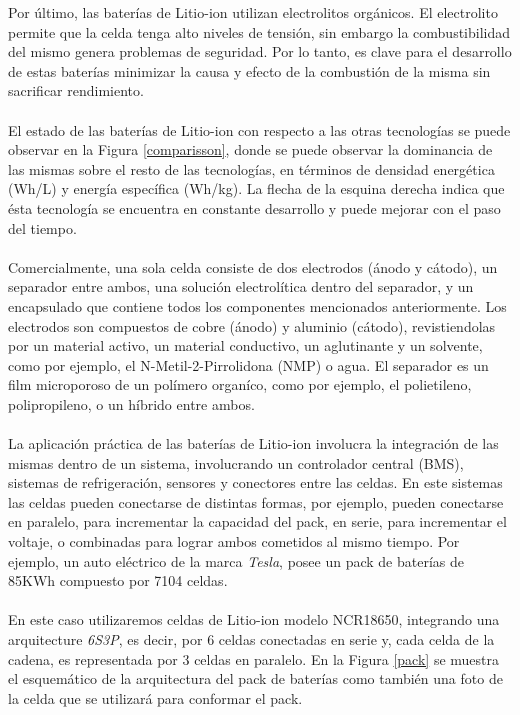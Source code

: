\documentclass[10pt,a4paper]{article}
\begin{document}
\noindent Por último, las baterías de Litio-ion utilizan electrolitos orgánicos. El electrolito permite que la celda tenga alto niveles de tensión, sin embargo la combustibilidad del mismo genera problemas de seguridad. Por lo tanto, es clave para el desarrollo de estas baterías minimizar la causa y efecto de la combustión de la misma sin sacrificar rendimiento.\\
\\
\noindent El estado de las baterías de Litio-ion con respecto a las otras tecnologías se puede observar en la Figura \ref{comparisson}, donde se puede observar la dominancia de las mismas sobre el resto de las tecnologías, en términos de densidad energética (Wh/L) y energía específica (Wh/kg). La flecha de la esquina derecha indica que ésta tecnología se encuentra en constante desarrollo y puede mejorar con el paso del tiempo.\\
\\
\noindent Comercialmente, una sola celda consiste de dos electrodos (ánodo y cátodo), un separador entre ambos, una solución electrolítica dentro del separador, y un encapsulado que contiene todos los componentes mencionados anteriormente. Los electrodos son compuestos de cobre (ánodo) y aluminio (cátodo), revistiendolas por un material activo, un material conductivo, un aglutinante y un solvente, como por ejemplo, el N-Metil-2-Pirrolidona (NMP) o agua. El separador es un film microporoso de un polímero organíco, como por ejemplo, el polietileno, polipropileno, o un híbrido entre ambos.\\
\\
\noindent La aplicación práctica de las baterías de Litio-ion involucra la integración de las mismas dentro de un sistema, involucrando un controlador central (BMS), sistemas de refrigeración, sensores y conectores entre las celdas. En este sistemas las celdas pueden conectarse de distintas formas, por ejemplo, pueden conectarse en paralelo, para incrementar la capacidad del pack, en serie, para incrementar el voltaje, o combinadas para lograr ambos cometidos al mismo tiempo. Por ejemplo, un auto eléctrico de la marca \emph{Tesla}, posee un pack de baterías de 85KWh compuesto por 7104 celdas.\\
\\
\noindent En este caso utilizaremos celdas de Litio-ion modelo NCR18650, integrando una arquitecture \emph{6S3P}, es decir, por 6 celdas conectadas en serie y, cada celda de la cadena, es representada por 3 celdas en paralelo. En la Figura \ref{pack} se muestra el esquemático de la arquitectura del pack de baterías como también una foto de la celda que se utilizará para conformar el pack. 
\end{document}
